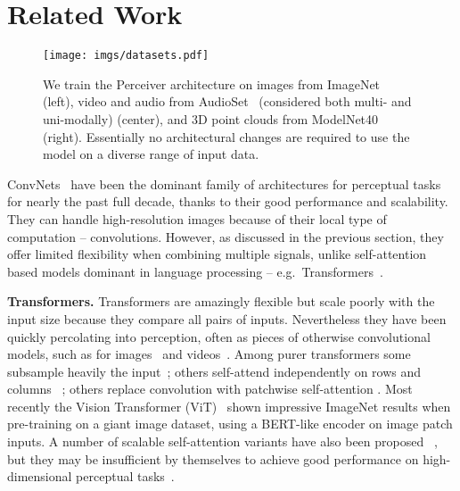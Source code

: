 \documentclass{article}
\begin{document}
\section{Related Work}
\label{sec:related}

\begin{figure*}[t]
\centering
\texttt{[image: imgs/datasets.pdf]}
\vspace{-12pt}
\caption{We train the Perceiver architecture on images from ImageNet~\cite{deng2009imagenet} (left), video and audio from AudioSet~\cite{gemmeke2017audio} (considered both multi- and uni-modally) (center), and 3D point clouds from ModelNet40~\cite{wu20153d} (right). Essentially no architectural changes are required to use the model on a diverse range of input data.}
\label{fig:modalities}
\vspace{-8pt}
\end{figure*}

ConvNets~\cite{fukushima1980selforganizing, lecun1998gradient, ciresan2011highperformance, krizhevsky2012imagenet} have been the dominant family of architectures for perceptual tasks for nearly the past full decade, thanks to their good performance and scalability. They can handle high-resolution images because of their local type of computation -- convolutions. However, as discussed in the previous section, they offer limited flexibility when combining multiple signals, unlike self-attention based models dominant in language processing -- e.g.\  Transformers~\cite{vaswani2017attention}.

\noindent \textbf{Transformers.}  Transformers are amazingly flexible but scale poorly with the input size because they compare all pairs of inputs. Nevertheless they have been quickly percolating into perception, often as pieces of otherwise convolutional models, such as for images~\cite{bello2019attention,cordonnier2019relationship, srinivas2021bottleneck} and videos~\cite{wang2018non,girdhar2019video}. Among purer transformers some subsample heavily the input~\citealt{chen2020generative}; others self-attend independently on rows and columns ~\cite{ho2019axial,wang2020axial}; others replace convolution with patchwise self-attention \cite{parmar2018image, ramachandran2019standalone, zhao2020exploring}. Most recently the Vision Transformer (ViT)~\cite{dosovitskiy2020image,touvron2020training} shown impressive ImageNet results when pre-training on a giant image dataset, using a BERT-like encoder on  image patch inputs. A number of scalable self-attention variants have also been proposed ~\cite{katharopoulos2020transformers,peng2021random,child2019generating,tay2020long, tay2020efficient, bello2021lambdanetworks}, but they may be insufficient by themselves to achieve good performance on high-dimensional perceptual tasks~\cite{tay2020long}.
\end{document}
